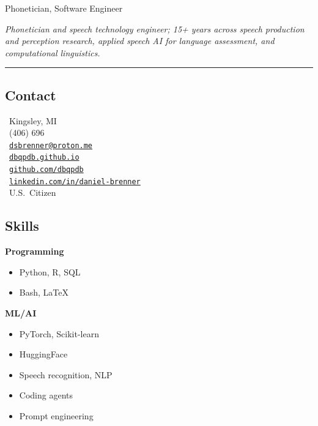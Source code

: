 \documentclass{article}
\begin{document}
\thispagestyle{empty}
\lfoot{}
\cfoot{}
\rfoot{}

 \hfill {\large Phonetician, Software Engineer}

\vspace{1em}
\noindent\small\textit{Phonetician and speech technology engineer; 15+ years across speech production and perception research, applied speech AI for language assessment, and computational linguistics.}

\vspace{0.3em}
\noindent\rule{\textwidth}{0.4pt}
\vspace{0.5em}

\noindent
\begin{minipage}[t]{0.28\textwidth}
\raggedright\small

\subsection*{Contact}
\faMapMarker*~Kingsley, MI \\[0.3em]
\faPhoneSquare*~(406) 696 \\[0.3em]
\faEnvelope~\href{mailto:dsbrenner@proton.me}{\texttt{dsbrenner@proton.me}} \\[0.3em]
\faGlobe~\href{https://dbqpdb.github.io}{\texttt{dbqpdb.github.io}} \\[0.3em]
\faGithub~\href{https://www.github.com/dbqpdb}{\texttt{github.com/dbqpdb}} \\[0.3em]
\faLinkedin~\href{https://www.linkedin.com/in/daniel-brenner-046597140}{\texttt{linkedin.com/in/daniel-brenner}} \\[0.3em]
\faPassport~U.S.\ Citizen

\subsection*{Skills}
\textbf{Programming}
\begin{itemize}[leftmargin=1em, itemsep=0pt, topsep=2pt, parsep=0pt]
  \item Python, R, SQL
  \item Bash, \LaTeX
\end{itemize}

\vspace{0.3em}
\textbf{ML/AI}
\begin{itemize}[leftmargin=1em, itemsep=0pt, topsep=2pt, parsep=0pt]
  \item PyTorch, Scikit-learn
  \item HuggingFace
  \item Speech recognition, NLP
  \item Coding agents
  \item Prompt engineering
\end{itemize}


\end{minipage}
\end{document}
